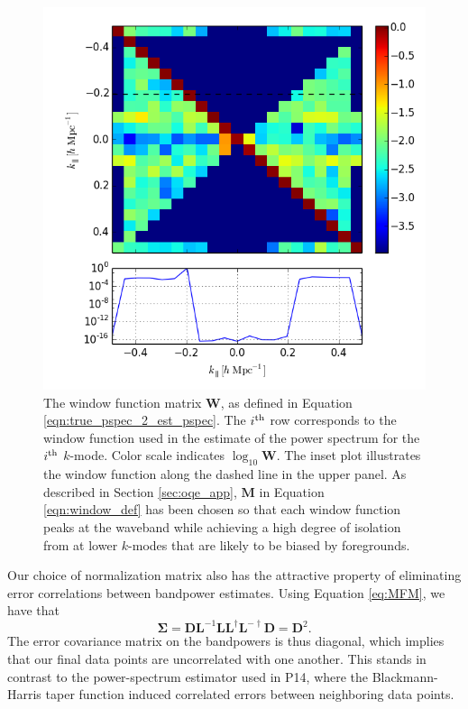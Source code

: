 \documentclass[twocolumn,numberedappendix]{emulateapj} \shorttitle{PSA64}
\begin{document}
\begin{figure}\centering
\includegraphics[width=\columnwidth]{plots/window.png}
\caption{
The window function matrix $\mathbf{W}$, as defined in Equation \eqref{eqn:true_pspec_2_est_pspec}.
The $i^{\rm th}$ row corresponds to the window function
used in the estimate of the power spectrum for the $i^{\rm th}$ $k$-mode.
Color scale indicates $\log_{10}\mathbf{W}$.
The inset plot illustrates the window function along the dashed line in the upper panel.
As described in Section \ref{sec:oqe_app}, $\mathbf{M}$ in Equation \eqref{eqn:window_def} has been chosen so that
each window function peaks at the waveband while achieving a high degree of isolation from
at lower $k$-modes that are likely to be biased by foregrounds.
}\label{fig:window_func}
\end{figure}

Our choice of normalization matrix also has the attractive property of eliminating error correlations
between bandpower estimates. Using Equation \eqref{eq:MFM}, we have
that \begin{equation} 
 \boldsymbol   \Sigma = \mathbf{D} \mathbf{L}^{-1}\mathbf{L}\mathbf{L}^{\dagger}\mathbf{L}^{-\dagger} \mathbf{D}
           = \mathbf{D}^2.
\end{equation}
The error covariance matrix on the bandpowers is thus diagonal, which implies
that our final data points are uncorrelated with one another. This stands in contrast to the power-spectrum estimator used in P14, where the Blackmann-Harris taper function induced correlated errors
between neighboring data points.
\end{document}
